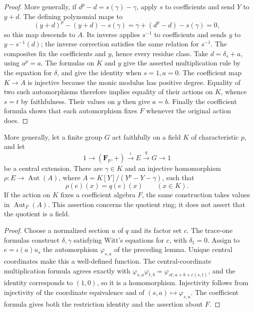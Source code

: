 \begin{proof}
More generally, if $d^p-d=s(\gamma)-\gamma$, apply $s$ to
coefficients and send $Y$ to $y+d$. The defining polynomial maps to
\[
 (y+d)^p-(y+d)-s(\gamma)
 =\gamma+(d^p-d)-s(\gamma)=0,
\]
so this map descends to $A$. Its inverse applies $s^{-1}$ to
coefficients and sends $y$ to $y-s^{-1}(d)$; the inverse correction
satisfies the same relation for $s^{-1}$. The composites fix the
coefficients and $y$, hence every residue class.
Take $d=\delta_s+a$, using $a^p=a$.
The formulas on $K$ and $y$ give the asserted multiplication rule
by the equation for $\delta$, and give the identity when $s=1,a=0$.
The coefficient map $K\to A$ is injective because the monic modulus
has positive degree. Equality of two such automorphisms therefore
implies equality of their actions on $K$, whence $s=t$ by
faithfulness. Their values on $y$ then give $a=b$.
Finally the coefficient formula shows that each automorphism fixes
$F$ whenever the original action does.
\end{proof}

\begin{lemma}
\label{lem:witt-central-quotient-action}
\leanok
More generally, let a finite group $G$ act faithfully on a field $K$
of characteristic $p$, and let
\[
 1\longrightarrow (\mathbf F_p,+)\xrightarrow{\iota}E
   \xrightarrow{q}G\longrightarrow1
\]
be a central extension. There are $\gamma\in K$ and an injective
homomorphism $\rho:E\to\operatorname{Aut}(A)$, where
$A=K[Y]/(Y^p-Y-\gamma)$, such that
\[
 \rho(e)(x)=q(e)(x)\qquad(x\in K).
\]
If the action on $K$ fixes a coefficient algebra $F$, the same
construction takes values in $\operatorname{Aut}_F(A)$.
This assertion concerns the quotient ring; it does not assert
that the quotient is a field.
\end{lemma}

\begin{proof}
Choose a normalized section $u$ of $q$ and its factor set $c$.
The trace-one formulas construct $\delta,\gamma$ satisfying
Witt's equations for $c$, with $\delta_1=0$.
Assign to $e=\iota(a)u_s$ the automorphism $\varphi_{s,a}$ of
the preceding lemma. Unique central coordinates make this a
well-defined function. The central-coordinate multiplication
formula agrees exactly with
$\varphi_{s,a}\varphi_{t,b}=\varphi_{st,a+b+c(s,t)}$,
and the identity corresponds to $(1,0)$, so it is a homomorphism.
Injectivity follows from injectivity of the coordinate equivalence
and of $(s,a)\mapsto\varphi_{s,a}$. The coefficient formula gives
both the restriction identity and the assertion about $F$.
\end{proof}

